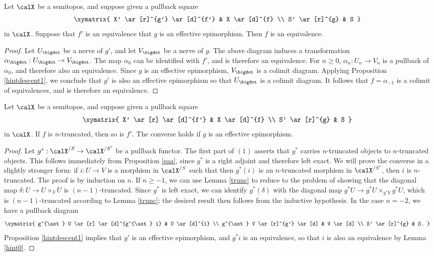 \begin{lemma}\label{hint0}
Let $\calX$ be a semitopos, and suppose given a pullback square
$$ \xymatrix{ X' \ar[r]^{g'} \ar[d]^{f'} & X \ar[d]^{f} \\
S' \ar[r]^{g} & S }$$
in $\calX$. Suppose that $f'$ is an equivalence that $g$ is an effective epimorphism.
Then $f$ is an equivalence.
\end{lemma}

\begin{proof}
Let $U_{\bigdot}$ be a \Cech nerve of $g'$, and let $V_{\bigdot}$ be a \Cech nerve of $g$.
The above diagram induces a transformation $\alpha_{\bigdot}: U_{\bigdot} \rightarrow V_{\bigdot}$. The map $\alpha_0$ can be identified with $f'$, and is therefore an equivalence.
For $n \geq 0$, $\alpha_n: U_n \rightarrow V_n$ is a pullback of $\alpha_0$, and therefore also an equivalence. Since $g$ is an effective epimorphism, $V_{\bigdot}$ is a colimit diagram.
Applying Proposition \ref{hintdescent1}, we conclude that $g'$ is also an effective epimorphism so that $U_{\bigdot}$ is a colimit diagram. It follows that $f = \alpha_{-1}$ is a colimit of
equivalences, and is therefore an equivalence.
\end{proof}

\begin{proposition}\label{hintdescent0}
Let $\calX$ be a semitopos, and suppose given a pullback square
$$ \xymatrix{ X' \ar[r] \ar[d]^{f'} & X \ar[d]^{f} \\
S' \ar[r]^{g} & S }$$
in $\calX$. If $f$ is $n$-truncated, then so is $f'$. The converse holds if $g$ is an effective epimorphism.
\end{proposition}

\begin{proof}
Let $g^{\ast}: \calX^{/S} \rightarrow \calX^{/S'}$ be a pullback functor. The first part of
$(1)$ asserts that $g^{\ast}$ carries $n$-truncated objects to $n$-truncated objects.
This follows immediately from Proposition \ref{eaa}, since $g^{\ast}$ is a right adjoint and therefore left exact. We will prove the converse in a slightly stronger form: if $i: U \rightarrow V$
is a morphism in $\calX^{/S}$ such that then $g^{\ast}(i)$ is an $n$-truncated morphism in
$\calX^{/S'}$, then $i$ is $n$-truncated. The proof is by induction on $n$. If $n \geq -1$, we
can use Lemma \ref{trunc} to reduce to the problem of showing that the diagonal map
$\delta: U \rightarrow U \times_{V} U$ is $(n-1)$-truncated. Since $g^{\ast}$ is left exact, 
we can identify $g^{\ast}(\delta)$ with the diagonal map $g^{\ast} U \rightarrow g^{\ast} U \times_{ g^{\ast} V} g^{\ast} U$, which is $(n-1)$-truncated according to Lemma \ref{trunc}; the desired result then follows from the inductive hypothesis. In the case $n=-2$, we have a pullback
diagram
$$ \xymatrix{ g^{\ast} U \ar[r] \ar[d]^{g^{\ast} i} & U \ar[d]^{i} \\
g^{\ast} V \ar[r]^{g'} \ar[d] & V \ar[d] \\
S' \ar[r]^{g} & S. }$$
Proposition \ref{hintdescent1} implies that $g'$ is an effective epimorphism, and
$g^{\ast} i$ is an equivalence, so that $i$ is also an equivalence by Lemma \ref{hint0}.
\end{proof}

